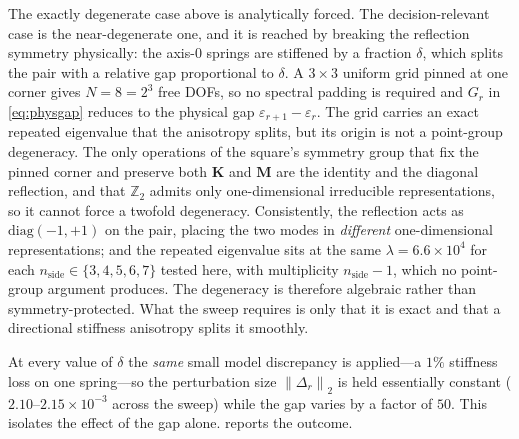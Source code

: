 \documentclass{ieeeaccess}
\newcommand{\M}{\mathbf{M}}
\newcommand{\K}{\mathbf{K}}
\newcommand{\norm}[1]{\left\lVert #1\right\rVert}
\begin{document}
The exactly degenerate case above is analytically forced. The decision-relevant case is the
near-degenerate one, and it is reached by breaking the reflection symmetry physically: the
axis-0 springs are stiffened by a fraction $\delta$, which splits the pair with a relative gap
proportional to $\delta$. A $3\times3$ uniform grid pinned at one corner gives $N=8=2^3$ free
DOFs, so no spectral padding is required and $G_r$ in \cref{eq:physgap} reduces to the physical
gap $\varepsilon_{r+1}-\varepsilon_r$. The grid carries an exact repeated eigenvalue that the anisotropy
splits, but its origin is not a point-group degeneracy. The only operations of the square's
symmetry group that fix the pinned corner and preserve both $\K$ and $\M$ are the identity and
the diagonal reflection, and that $\mathbb Z_2$ admits only one-dimensional irreducible
representations, so it cannot force a twofold degeneracy. Consistently, the reflection acts as
$\mathrm{diag}(-1,+1)$ on the pair, placing the two modes in \emph{different} one-dimensional
representations; and the repeated eigenvalue sits at the same $\lambda=6.6\times10^{4}$ for each
$n_{\mathrm{side}}\in\{3,4,5,6,7\}$ tested here, with multiplicity $n_{\mathrm{side}}-1$, which no point-group argument
produces. The degeneracy is therefore algebraic rather than symmetry-protected. What the sweep
requires is only that it is exact and that a directional stiffness anisotropy splits it smoothly.

At every value of $\delta$ the \emph{same} small model discrepancy is applied---a $1\%$
stiffness loss on one spring---so the perturbation size $\norm{\Delta_r}_2$ is held essentially
constant ($2.10$--$2.15\times10^{-3}$ across the sweep) while the gap varies by a factor of
$50$. This isolates the effect of the gap alone.  reports the outcome.
\end{document}
